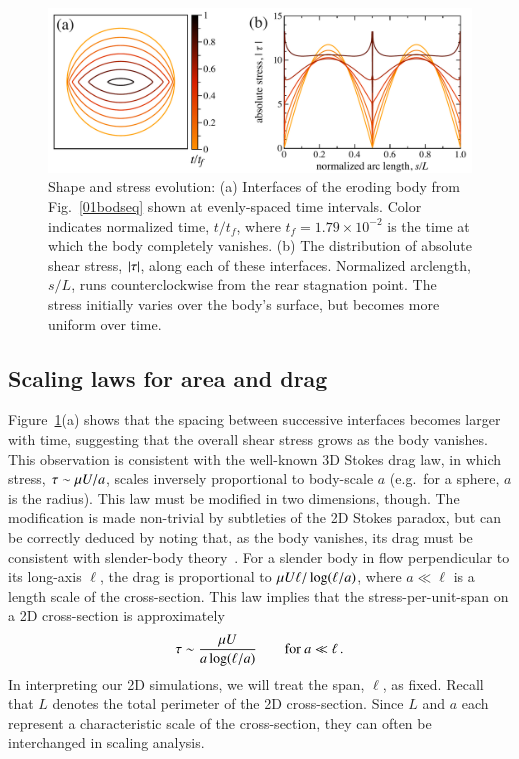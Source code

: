 \documentclass[preprint, 10pt]{elsarticle}
\begin{document}
\begin{figure}%
\begin{center}
\includegraphics[width = 0.8 \textwidth]{./figs/shrink_intface.pdf}
\caption{
Shape and stress evolution: (a) Interfaces of the eroding body from Fig.~\ref{01bodseq} shown at evenly-spaced time intervals. Color indicates normalized time, $t/t_f$, where $t_f = 1.79 \times 10^{-2}$ is the time at which the body completely vanishes. (b) The distribution of absolute shear stress, $\lvert \tau \rvert$, along each of these interfaces. Normalized arclength, $s/L$, runs counterclockwise from the rear stagnation point. The stress initially varies over the body's surface, but becomes more uniform over time.}
\label{shrink_intface}
\end{center}
\end{figure}

\subsection{Scaling laws for area and drag}
\label{sec:scaling}

Figure~\ref{shrink_intface}(a) shows that the spacing between successive interfaces becomes larger with time, suggesting that the overall shear stress grows as the body vanishes. This observation is consistent with the well-known 3D Stokes drag law, in which stress, $\tau \sim \mu U / a$, scales inversely proportional to body-scale $a$ (e.g.~for a sphere, $a$ is the radius). This law must be modified in two dimensions, though. The modification is made non-trivial by subtleties of the 2D Stokes paradox, but can be correctly deduced by noting that, as the body vanishes, its drag must be consistent with slender-body theory~\cite{batchelor1970slender, MooreJFM2012}. 
For a slender body in flow perpendicular to its long-axis $\ell$, the drag is proportional to
$\mu U \ell/ \log(\ell/a)$, where $a \ll \ell $ is a length scale of the cross-section. This law implies that the stress-per-unit-span on a 2D cross-section is approximately
\begin{align}
  \label{eqn:stresslaw}
  \tau \sim \frac{\mu U}{a \log(\ell/a)} \qquad \text{for } a \ll \ell \, .
\end{align}
In interpreting our 2D simulations, we will treat the span, $\ell$, as
fixed. Recall that $L$ denotes the total perimeter of the 2D cross-section. Since $L$ and $a$ each represent a characteristic scale of the cross-section, they can often be interchanged in scaling analysis.
\end{document}
